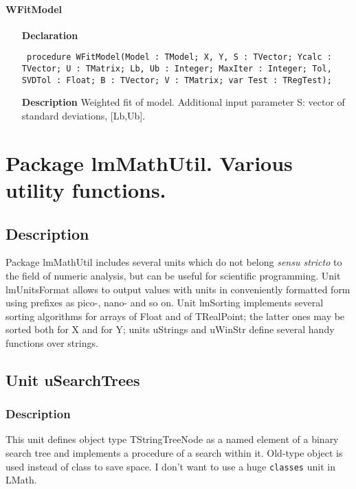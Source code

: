 \documentclass[12pt,a4paper,oneside]{report}
\newcommand{\lmatha}[1]{   %
	\marginpar{\vspace{#1} 
		\begin{flushright}
			LMath 0.5
	\end{flushright} }
}
\newcommand{\declarationitem}[1]{\textbf{#1}}
\newcommand{\descriptiontitle}[1]{\textbf{#1}}
\newcommand{\code}[1]{\texttt{#1}}
\begin{document}
\subsubsection{WFitModel}
\label{umodels-WFitModel}
\begin{itemize}\item[\declarationitem{Declaration}\hfill]
	\begin{flushleft}
		\code{
			procedure WFitModel(Model : TModel; X, Y, S : TVector; Ycalc : TVector; U : TMatrix; Lb, Ub : Integer; MaxIter : Integer; Tol, SVDTol : Float; B : TVector; V : TMatrix; var Test : TRegTest);}
		
	\end{flushleft}
	
	\par
	\item[\descriptiontitle{Description}]
	Weighted fit of model. Additional input parameter S: vector of standard deviations, [Lb,Ub]. 	
\end{itemize}

\chapter[Package lmMathUtil]{Package lmMathUtil. Various utility functions.}\label{package-lmMathUtil}
\section{Description}
Package lmMathUtil includes several units which do not belong \textit{sensu stricto} to the field of numeric analysis, but can be useful for scientific programming. Unit lmUnitsFormat allows to output values with units in conveniently formatted form using prefixes as pico-, nano- and so on. Unit lmSorting implements several sorting algorithms for arrays of Float and of TRealPoint; the latter ones may be sorted both for X and for Y; units uStrings and uWinStr define several handy functions over strings.   
\section{Unit uSearchTrees}\lmatha{-24pt}
\label{usearchtrees}
\subsection{Description}
This unit defines object type TStringTreeNode as a named element of a binary search tree and implements a procedure of a search within it. Old-type object is used instead of class to save space. I don't want to use a huge \code{classes} unit in LMath.
\end{document}
